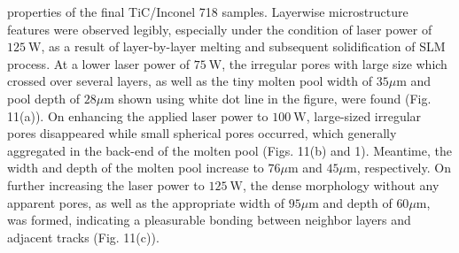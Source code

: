 \documentclass[10pt]{article}
\begin{document}
properties of the final TiC/Inconel 718 samples. Layerwise microstructure features were observed legibly, especially under the condition of laser power of $125 \mathrm{~W}$, as a result of layer-by-layer melting and subsequent solidification of SLM process. At a lower laser power of $75 \mathrm{~W}$, the irregular pores with large size which crossed over several layers, as well as the tiny molten pool width of $35 \mu \mathrm{m}$ and pool depth of $28 \mu \mathrm{m}$ shown using white dot line in the figure, were found (Fig. 11(a)). On enhancing the applied laser power to $100 \mathrm{~W}$, large-sized irregular pores disappeared while small spherical pores occurred, which generally aggregated in the back-end of the molten pool (Figs. 11(b) and 1). Meantime, the width and depth of the molten pool increase to $76 \mu \mathrm{m}$ and $45 \mu \mathrm{m}$, respectively. On further increasing the laser power to $125 \mathrm{~W}$, the dense morphology without any apparent pores, as well as the appropriate width of $95 \mu \mathrm{m}$ and depth of $60 \mu \mathrm{m}$, was formed, indicating a pleasurable bonding between neighbor layers and adjacent tracks (Fig. 11(c)).
\end{document}
